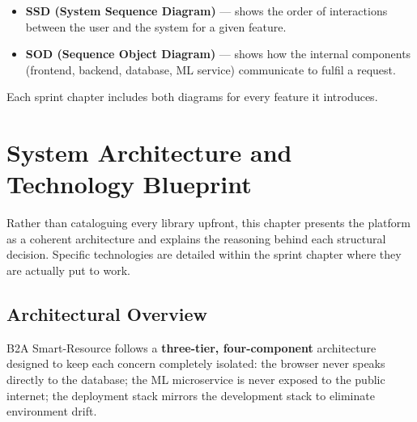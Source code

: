 \documentclass[12pt,a4paper]{report}
\begin{document}
\begin{itemize}
  \item \textbf{SSD (System Sequence Diagram)} --- shows the order of interactions
        between the user and the system for a given feature.
  \item \textbf{SOD (Sequence Object Diagram)} --- shows how the internal components
        (frontend, backend, database, ML service) communicate to fulfil a request.
\end{itemize}

Each sprint chapter includes both diagrams for every feature it introduces.

\chapter{System Architecture and Technology                              
Blueprint}
\label{chap:arch}

Rather than cataloguing every library upfront, this chapter presents the platform as a
coherent architecture and explains the reasoning behind each structural decision.
Specific technologies are detailed within the sprint chapter where they are actually put to work.

\section{Architectural Overview}

B2A Smart-Resource follows a \textbf{three-tier, four-component} architecture designed
to keep each concern completely isolated: the browser never speaks directly to the
database; the ML microservice is never exposed to the public internet; the deployment
stack mirrors the development stack to eliminate environment drift.

\vspace{0.8em}
\end{document}
